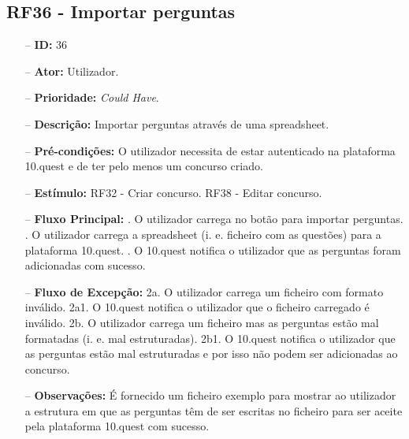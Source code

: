 \subsection{RF36 - Importar perguntas}
\begin{itemize}
	\item[--] \textbf{ID:} 36
	\item[--]  \textbf{Ator:} Utilizador.
	\item[--]  \textbf{Prioridade:} \textit{Could Have}.
	\item[--]  \textbf{Descrição:} Importar perguntas através de uma spreadsheet. 
	\item[--]  \textbf{Pré-condições:} O utilizador necessita de estar autenticado na plataforma 10.quest e de ter pelo menos um concurso criado.
	\item[--]  \textbf{Estímulo:}  
	\subitem RF32 - Criar concurso.
	\subitem RF38 - Editar concurso.
	\item[--]  \textbf{Fluxo Principal:} 
	. O utilizador carrega no botão para importar perguntas.
	. O utilizador carrega a spreadsheet (i. e. ficheiro com as questões) para a plataforma 10.quest.
	. O 10.quest notifica o utilizador que as perguntas foram adicionadas com sucesso.
	\item[--]  \textbf{Fluxo de Excepção:} 
	\subitem 2a. O utilizador carrega um ficheiro com formato inválido.
	\subitem 2a1. O 10.quest notifica o utilizador que o ficheiro carregado é inválido.
	\subitem 2b. O utilizador carrega um ficheiro mas as perguntas estão mal formatadas (i. e. mal estruturadas).
	\subitem 2b1. O 10.quest notifica o utilizador que as perguntas estão mal estruturadas e por isso não podem ser adicionadas ao concurso.
	\item[--]  \textbf{Observações:} É fornecido um ficheiro exemplo para mostrar ao utilizador a estrutura em que as perguntas têm de ser escritas no ficheiro para ser aceite pela plataforma 10.quest com sucesso.
\end{itemize}
\newpage

